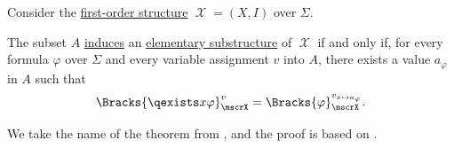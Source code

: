 \begin{theorem}\label{thm:tarski_vaugh_criterion}
  Consider the \hyperref[def:fol_structure]{first-order structure} \( \mscrX = (X, I) \) over \( \Sigma \).

  The subset \( A \) \hyperref[def:fol_substructure/determines]{induces} an \hyperref[def:elementary_embedding]{elementary substructure} of \( \mscrX \) if and only if, for every formula \( \varphi \) over \( \Sigma \) and every variable assignment \( v \) into \( A \), there exists a value \( a_\varphi \) in \( A \) such that
  \begin{equation*}
    \Bracks{\qexists x \varphi}_\mscrX^v = \Bracks{\varphi}_\mscrX^{v_{x \mapsto a_\varphi}}.
  \end{equation*}
\end{theorem}
\begin{comments}
  \item We take the name of the theorem from \cite[lemma 1.15.22]{Kunen2013SetTheory}, and the proof is based on \cite[thm. 2.3.33]{Hinman2005Logic}.
\end{comments}
